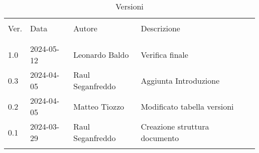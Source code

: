 \documentclass[italian,12pt]{article} %
\begin{document}


\newpage



\begin{table}[!h]

	\begin{center}
		\caption*{Versioni}
		\vspace{0.5cm}
		\begin{tabular}{ l l l l p{6cm} }
			\hline                                                                                \\[-2ex]
			Ver. & Data       & Autore & Descrizione \\
			\\[-2ex] \hline \\[-1.5ex]
			1.0 & 2024-05-12 & Leonardo Baldo   & Verifica finale \\
			0.3 & 2024-04-05 & Raul Seganfreddo & Aggiunta Introduzione \\
			0.2 & 2024-04-05 & Matteo Tiozzo    & Modificato tabella versioni \\
			0.1 & 2024-03-29 & Raul Seganfreddo & Creazione struttura documento \\
			\\[-1.5ex] \hline
		\end{tabular}
	\end{center}
\end{table}

\newpage

\tableofcontents

\listoftables

\listoffigures

\newpage



\newpage



\newpage



\newpage



\newpage




\newpage




\newpage
\end{document}
